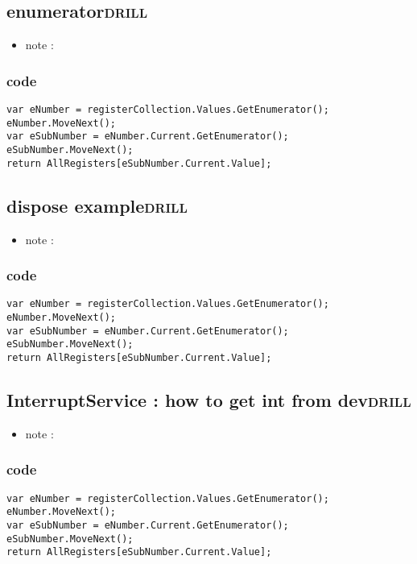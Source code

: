 \documentclass[11pt]{article}
\begin{document}
\subsection{enumerator\hfill{}\textsc{drill}}
\label{sec:org37a8e6a}
\begin{itemize}
\item note :
\end{itemize}
\subsubsection{code}
\label{sec:orgf0237e5}
\begin{verbatim}
var eNumber = registerCollection.Values.GetEnumerator();
eNumber.MoveNext();
var eSubNumber = eNumber.Current.GetEnumerator();
eSubNumber.MoveNext();
return AllRegisters[eSubNumber.Current.Value];

\end{verbatim}

\subsection{dispose example\hfill{}\textsc{drill}}
\label{sec:org703f744}
\begin{itemize}
\item note :
\end{itemize}
\subsubsection{code}
\label{sec:org73f0736}
\begin{verbatim}
var eNumber = registerCollection.Values.GetEnumerator();
eNumber.MoveNext();
var eSubNumber = eNumber.Current.GetEnumerator();
eSubNumber.MoveNext();
return AllRegisters[eSubNumber.Current.Value];

\end{verbatim}

\subsection{InterruptService : how to get int from dev\hfill{}\textsc{drill}}
\label{sec:orgb6d9909}
\begin{itemize}
\item note :
\end{itemize}
\subsubsection{code}
\label{sec:org7723626}
\begin{verbatim}
var eNumber = registerCollection.Values.GetEnumerator();
eNumber.MoveNext();
var eSubNumber = eNumber.Current.GetEnumerator();
eSubNumber.MoveNext();
return AllRegisters[eSubNumber.Current.Value];

\end{verbatim}
\end{document}
